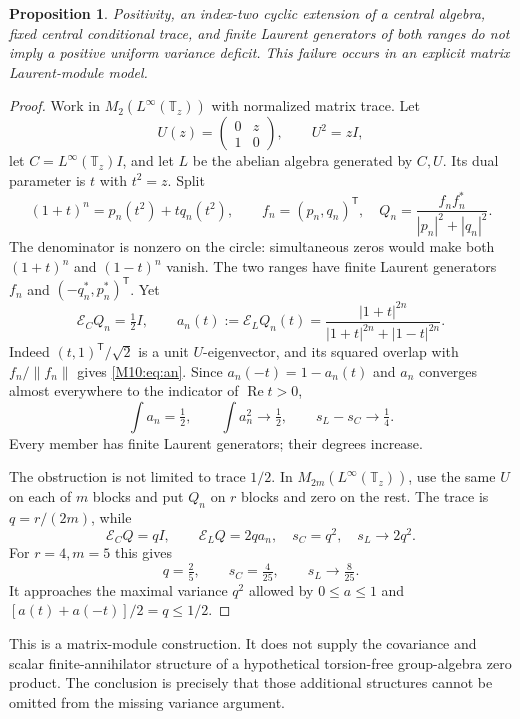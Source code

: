 \documentclass[11pt,a4paper,oneside]{report}
\newtheorem{proposition}[theorem]{Proposition}
\theoremstyle{definition}
\theoremstyle{remark}
\DeclareMathOperator{\Rea}{Re}
\newcommand{\T}{\mathbb T}
\begin{document}
\begin{proposition}\label{M10:prop:variance}
Positivity, an index-two cyclic extension of a central algebra,
fixed central conditional trace, and finite Laurent generators
of both ranges do not imply a positive uniform variance deficit.
This failure occurs in an explicit matrix Laurent-module model.
\end{proposition}
\begin{proof}
Work in $M_2(L^\infty(\T_z))$ with normalized matrix trace.
Let
\[
U(z)=\begin{pmatrix}0&z\\1&0\end{pmatrix},\qquad U^2=zI,
\]
let $C=L^\infty(\T_z)I$, and let $L$ be the abelian algebra
generated by $C,U$. Its dual parameter is $t$ with $t^2=z$.
Split
\[
(1+t)^n=p_n(t^2)+tq_n(t^2),\qquad f_n=(p_n,q_n)^{\mathsf T},
\quad Q_n=\frac{f_nf_n^*}{|p_n|^2+|q_n|^2}.
\]
The denominator is nonzero on the circle: simultaneous zeros
would make both $(1+t)^n$ and $(1-t)^n$ vanish.
The two ranges have finite Laurent generators $f_n$ and
$(-q_n^*,p_n^*)^{\mathsf T}$. Yet
\begin{equation}\label{M10:eq:an}
\mathcal E_CQ_n=\tfrac12 I,\qquad
a_n(t):=\mathcal E_LQ_n(t)
=\frac{|1+t|^{2n}}{|1+t|^{2n}+|1-t|^{2n}}.
\end{equation}
Indeed $(t,1)^{\mathsf T}/\sqrt2$ is a unit $U$-eigenvector,
and its squared overlap with $f_n/\|f_n\|$ gives
\eqref{M10:eq:an}. Since $a_n(-t)=1-a_n(t)$ and $a_n$ converges
almost everywhere to the indicator of $\Rea t>0$,
\[
\int a_n=\tfrac12,\qquad \int a_n^2\longrightarrow\tfrac12,
\qquad s_L-s_C\longrightarrow\tfrac14.
\]
Every member has finite Laurent generators; their degrees increase.

The obstruction is not limited to trace $1/2$. In
$M_{2m}(L^\infty(\T_z))$, use the same $U$ on each of $m$
blocks and put $Q_n$ on $r$ blocks and zero on the rest.
The trace is $q=r/(2m)$, while
\[
\mathcal E_CQ=qI,\qquad \mathcal E_LQ=2q a_n,
\quad s_C=q^2,\quad s_L\longrightarrow2q^2.
\]
For $r=4,m=5$ this gives
\[
q=\tfrac25,\qquad s_C=\tfrac4{25},\qquad
s_L\longrightarrow\tfrac8{25}.
\]
It approaches the maximal variance $q^2$ allowed by
$0\le a\le1$ and $[a(t)+a(-t)]/2=q\le1/2$.
\end{proof}

This is a matrix-module construction. It does not supply the
covariance and scalar finite-annihilator structure of a hypothetical
torsion-free group-algebra zero product. The conclusion is precisely
that those additional structures cannot be omitted from the missing
variance argument.
\end{document}
